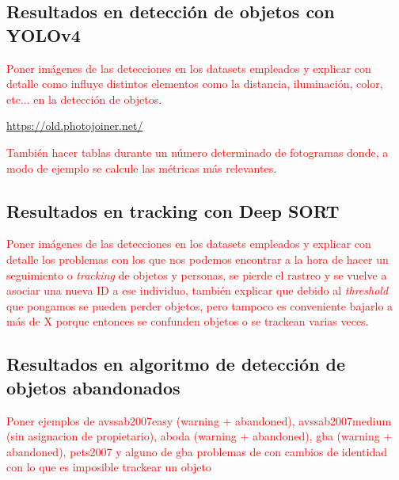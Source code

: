 \newpage

\subsection{Resultados en detección de objetos con YOLOv4}
\label{subsec:resultados-yolov4-tf}

\textcolor{red}{Poner imágenes de las detecciones en los datasets empleados y explicar con detalle como influye distintos elementos como la distancia, iluminación, color, etc... en la detección de objetos}.

\url{https://old.photojoiner.net/}

\textcolor{red}{También hacer tablas durante un número determinado de fotogramas donde, a modo de ejemplo se calcule las métricas más relevantes}.

\newpage

\subsection{Resultados en tracking con Deep SORT}
\label{subsec:resultados-deepsort}

\textcolor{red}{Poner imágenes de las detecciones en los datasets empleados y explicar con detalle los problemas con los que nos podemos encontrar a la hora de hacer un seguimiento o \textit{tracking} de objetos y personas, se pierde el rastreo y se vuelve a asociar una nueva ID a ese individuo, también explicar que debido al \textit{threshold} que pongamos se pueden perder objetos, pero tampoco es conveniente bajarlo a más de X porque entonces se confunden objetos o se trackean varias veces}.

\newpage

\subsection{Resultados en algoritmo de detección de objetos abandonados}
\label{subsec:resultados-abandon-algorithm}

\textcolor{red}{Poner ejemplos de avssab2007easy (warning + abandoned), avssab2007medium (sin asignacion de propietario), aboda (warning + abandoned), gba (warning + abandoned), pets2007 y alguno de gba problemas de con cambios de identidad con lo que es imposible trackear un objeto}

